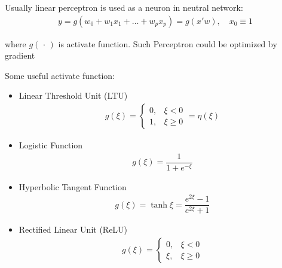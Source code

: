     Usually linear perceptron is used as a neuron in neutral network:
    \begin{align}
        y=g(w_0+w_1x_1+\ldots+w_px_p) =g(x'w),\quad x_0\equiv 1
    \end{align}

    where $ g(\, \cdot \, ) $ is activate function. Such Perceptron could be optimized by gradient

    Some useful activate function:
\begin{itemize}[topsep=2pt,itemsep=0pt]
    \item Linear Threshold Unit (LTU)
    \begin{align}
        g(\xi )=\begin{cases}
            0,& \xi < 0\\
            1,& \xi \geq 0
        \end{cases} =\eta(\xi )
    \end{align}
    \item Logistic Function
    \begin{align}
        g(\xi )=\dfrac{1}{1+e^{-\xi } } 
    \end{align}
    \item Hyperbolic Tangent Function
    \begin{align}
        g(\xi )=\tanh \xi =\dfrac{e^{2\xi }-1}{e^{2\xi }+1} 
    \end{align}
    \item Rectified Linear Unit (ReLU)
    \begin{align}
        g(\xi )= \begin{cases}
            0,& \xi < 0\\
            \xi ,& \xi \geq 0
        \end{cases}
    \end{align}
\end{itemize}

